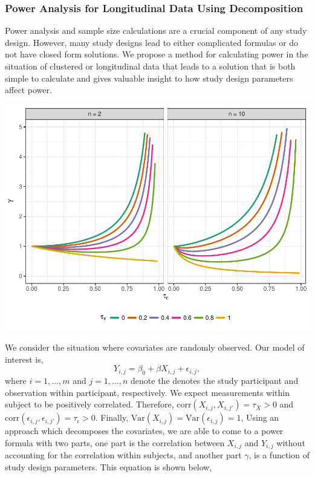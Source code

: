 \documentclass[11pt]{article}
\begin{document}
\begin{multicols}{2}
\subsubsection*{Power Analysis for Longitudinal Data Using Decomposition}
Power analysis and sample size calculations are a crucial component of any study design. However, many study designs lead to either complicated formulas or do not have closed form solutions. We propose a method for calculating power in the situation of clustered or longitudinal data that leads to a solution that is both simple to calculate and gives valuable insight to how study design parameters affect power.
\begin{center}\vspace{0cm}
\includegraphics[width=1\linewidth]{gamma_analysis.pdf}
\label{fig:gamma}
\end{center}\vspace{0cm}
\hspace{.5cm}We consider the situation where covariates are randomly observed. Our model of interest is,
\begin{equation} \label{eq:model}
Y_{i,j}=\beta_0+ \beta X_{i,j}+ \epsilon_{i,j},
\end{equation}
where $i=1,\ldots, m$ and $j=1,\ldots,n$ denote the denotes the study participant and observation within participant, respectively. We expect measurements within subject to be positively correlated. Therefore, corr$(X_{i,j},X_{i,j'}) = \tau_X >0$ and corr$(\epsilon_{i,j},\epsilon_{i,j'}) = \tau_\epsilon>0$. Finally, $\mbox{Var}(X_{i,j}) = \mbox{Var}(\epsilon_{i,j}) =1$, Using an approach which decomposes the covariates, we are able to come to a power formula with two parts, one part is the correlation between $X_{i,j}$ and $Y_{i,j}$ without accounting for the correlation within subjects, and another part $\gamma$, is a function of study design parameters. This equation is shown below, 

\end{multicols}
\end{document}
